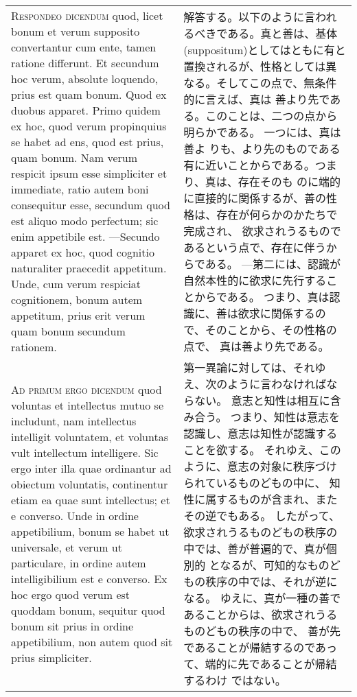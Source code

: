 \documentclass[10pt]{jsarticle} %
\begin{document}
\begin{longtable}{p{21em}p{21em}}
\\


{\scshape  Respondeo dicendum} quod, licet bonum et verum
supposito convertantur cum ente, tamen ratione differunt. Et secundum
hoc verum, absolute loquendo, prius est quam bonum. Quod ex duobus
apparet. 
Primo quidem ex hoc, quod verum propinquius se habet ad ens,
quod est prius, quam bonum. Nam verum respicit ipsum esse simpliciter et
immediate, ratio autem boni consequitur esse, secundum quod est aliquo
modo perfectum; sic enim appetibile est. 
---Secundo apparet ex hoc, quod
cognitio naturaliter praecedit appetitum. Unde, cum verum respiciat
cognitionem, bonum autem appetitum, prius erit verum quam bonum secundum
rationem.

&

解答する。以下のように言われるべきである。真と善は、基体(suppositum)としてはともに有と
置換されるが、性格としては異なる。そしてこの点で、無条件的に言えば、真は
善より先である。このことは、二つの点から明らかである。
一つには、真は善よ
りも、より先のものである有に近いことからである。つまり、真は、存在そのも
のに端的に直接的に関係するが、善の性格は、存在が何らかのかたちで完成され、
欲求されうるものであるという点で、存在に伴うからである。
---第二には、認識が自然本性的に欲求に先行することからである。
つまり、真は認識に、善は欲求に関係するので、そのことから、その性格の点で、
 真は善より先である。


\\


{\scshape  Ad primum ergo dicendum} quod voluntas et
intellectus mutuo se includunt, nam intellectus intelligit voluntatem,
et voluntas vult intellectum intelligere. Sic ergo inter illa quae
ordinantur ad obiectum voluntatis, continentur etiam ea quae sunt
intellectus; et e converso. Unde in ordine appetibilium, bonum se habet
ut universale, et verum ut particulare, in ordine autem intelligibilium
est e converso. Ex hoc ergo quod verum est quoddam bonum, sequitur quod
bonum sit prius in ordine appetibilium, non autem quod sit prius
simpliciter.

&

第一異論に対しては、それゆえ、次のように言わなければならない。
意志と知性は相互に含み合う。
つまり、知性は意志を認識し、意志は知性が認識することを欲する。
それゆえ、このように、意志の対象に秩序づけられているものどもの中に、
 知性に属するものが含まれ、またその逆でもある。
したがって、欲求されうるものどもの秩序の中では、善が普遍的で、真が個別的
 となるが、可知的なものどもの秩序の中では、それが逆になる。
ゆえに、真が一種の善であることからは、欲求されうるものどもの秩序の中で、
 善が先であることが帰結するのであって、端的に先であることが帰結するわけ
 ではない。


\end{longtable}
\end{document}
